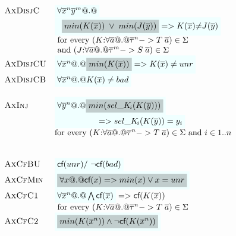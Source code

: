 \begin{figure}
{\[\begin{array}{c}
\begin{array}{lll}
 \textsc{AxDisjC} & \formula{\forall \oln{x}{n}\oln{y}{m} @.@} \\
                  & \formula{\;\;\highlight{min(K(\ol{x}))\;\lor\;min(J(\ol{y}))} =>
                                  K(\ol{x}){\neq}J(\ol{y})} \\
                  & \text{ for every } (K{:}\forall\as @.@ \oln{\tau}{n} -> T\;\as) \in \Sigma \\
                  & \text{ and } (J{:}\forall\as @.@ \oln{\tau}{m} -> S\;\as) \in \Sigma \\
 \textsc{AxDisjCU} & \formula{\forall \oln{x}{n} @.@ \highlight{min(K(\ol{x}))} => K(\ol{x}) \neq unr} \\
 \textsc{AxDisjCB} & \formula{\forall \oln{x}{n} @.@ K(\ol{x}) \neq \bad} \\ \\
 \textsc{AxInj}   & \formula{\forall \oln{y}{n} @.@ \highlight{min(\sel{K}{i}(K(\ys)))}} \\ %
                  & \formula{\quad\qquad\qquad => \sel{K}{i}(K(\ys)) = y_i} \\
                  & \text{for every } (K{:}\forall\as @.@ \oln{\tau}{n} -> T\;\as) \in \Sigma \text{ and } i \in 1..n  \\ \\ \\
 \textsc{AxCfBU}  & \formula{\lcf{\unr} /\ \lncf{\bad}} \\
 \textsc{AxCfMin} & \formula{\highlight{\forall x @.@ \lcf{x} => min(x) \lor x = unr}} \\
 \textsc{AxCfC1} & \formula{\forall \oln{x}{n} @.@ \bigwedge\lcf{\ol{x}}} => \lcf{K(\ol{x})} \\
                 & \text{ for every } (K{:}\forall\as @.@ \oln{\tau}{n} -> T\;\as) \in \Sigma \\
 \textsc{AxCfC2} & \formula{\highlight{min(K(\oln{x}{n}))\land\neg\lcf{K(\oln{x}{n})}}} \\

\end{array}
\end{array}\]}
\end{figure}
